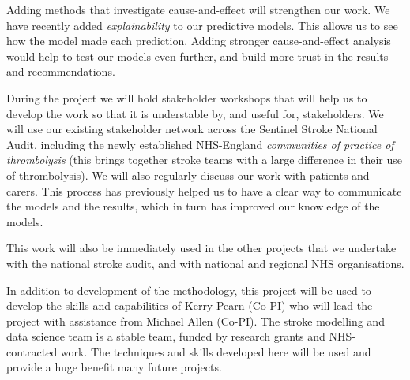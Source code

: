 Adding methods that investigate cause-and-effect will strengthen our work. We have recently added \textit{explainability} to our predictive models. This allows us to see how the model made each prediction. Adding stronger cause-and-effect analysis would help to test our models even further, and build more trust in the results and recommendations. 

During the project we will hold stakeholder workshops that will help us to develop the work so that it is understable by, and useful for, stakeholders. We will use our existing stakeholder network across the Sentinel Stroke National Audit, including the newly established NHS-England \textit{communities of practice of thrombolysis} (this brings together stroke teams with a large difference in their use of thrombolysis). We will also regularly discuss our work with patients and carers. This process has previously helped us to have a clear way to communicate the models and the results, which in turn has improved our knowledge of the models.

This work will also be immediately used in the other projects that we undertake with the national stroke audit, and with national and regional NHS organisations. 

In addition to development of the methodology, this project will be used to develop the skills and capabilities of Kerry Pearn (Co-PI) who will lead the project with assistance from Michael Allen (Co-PI). The stroke modelling and data science team is a stable team, funded by research grants and NHS-contracted work. The techniques and skills developed here will be used and provide a huge benefit many future projects.